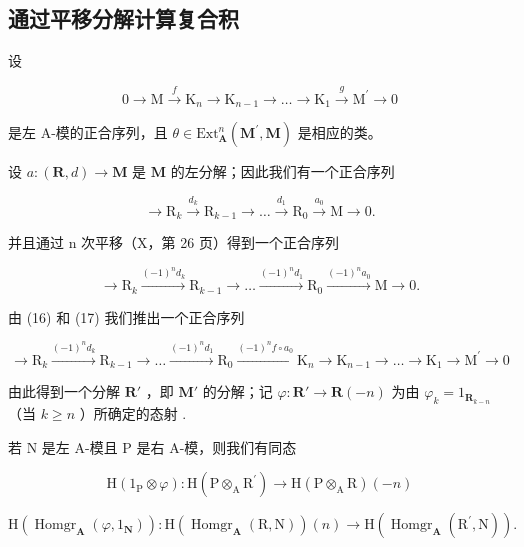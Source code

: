 \subsection{通过平移分解计算复合积}

设

\[
0 \rightarrow \mathrm{M} \xrightarrow {f} \mathrm{K} _ {n} \rightarrow \mathrm{K} _ {n - 1} \rightarrow \dots \rightarrow \mathrm{K} _ {1} \xrightarrow {g} \mathrm{M} ^ {\prime} \rightarrow 0\tag{16}
\]

是左 A-模的正合序列，且 \(\theta\in\mathrm{Ext}_{\mathbf{A}}^{n}(\mathbf{M}^{\prime},\mathbf{M})\) 是相应的类。

设 \(a:(\mathbf{R},d)\to \mathbf{M}\) 是 \(\mathbf{M}\) 的左分解；因此我们有一个正合序列

\[
\rightarrow \mathrm{R} _ {k} \xrightarrow {d _ {k}} \mathrm{R} _ {k - 1} \rightarrow \dots \xrightarrow {d _ {1}} \mathrm{R} _ {0} \xrightarrow {a _ {0}} \mathrm{M} \rightarrow 0.
\]

并且通过 n 次平移（X，第 26 页）得到一个正合序列

\[
\rightarrow \mathrm{R} _ {k} \xrightarrow {(- 1) ^ {n} d _ {k}} \mathrm{R} _ {k - 1} \rightarrow \dots \xrightarrow {(- 1) ^ {n} d _ {1}} \mathrm{R} _ {0} \xrightarrow {(- 1) ^ {n} a _ {0}} \mathrm{M} \rightarrow 0.\tag{17}
\]

由 (16) 和 (17) 我们推出一个正合序列

\[
\rightarrow \mathrm{R} _ {k} \xrightarrow {(- 1) ^ {n} d _ {k}} \mathrm{R} _ {k - 1} \rightarrow \dots \xrightarrow {(- 1) ^ {n} d _ {1}} \mathrm{R} _ {0} \xrightarrow {(- 1) ^ {n} f \circ a _ {0}} \mathrm{K} _ {n} \rightarrow \mathrm{K} _ {n - 1} \rightarrow \dots \rightarrow \mathrm{K} _ {1} \rightarrow \mathrm{M} ^ {\prime} \rightarrow 0
\]

由此得到一个分解 \(\mathbf{R}'\) ，即 \(\mathbf{M}'\) 的分解；记 \(\varphi: \mathbf{R}' \to \mathbf{R}(-n)\) 为由 \(\varphi_k = 1_{\mathbf{R}_{k-n}}\) （当 \(k \geqslant n\) ）所确定的态射 .

若 N 是左 A-模且 P 是右 A-模，则我们有同态

\[
\mathrm{H} \left(1 _ {\mathrm{P}} \otimes \varphi\right): \mathrm{H} \left(\mathrm{P} \otimes_ {\mathrm{A}} \mathrm{R} ^ {\prime}\right)\rightarrow \mathrm{H} \left(\mathrm{P} \otimes_ {\mathrm{A}} \mathrm{R}\right) (- n)
\]

\[
\mathrm{H} \left(\operatorname{Homgr} _ {\mathbf {A}} (\varphi , 1 _ {\mathbf {N}})\right): \mathrm{H} \left(\operatorname{Homgr} _ {\mathbf {A}} (\mathrm{R}, \mathrm{N})\right) (n) \rightarrow \mathrm{H} \left(\operatorname{Homgr} _ {\mathbf {A}} \left(\mathrm{R} ^ {\prime}, \mathrm{N}\right)\right).
\]

